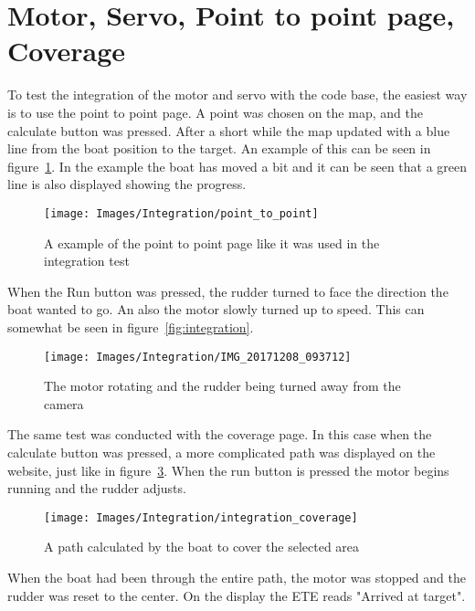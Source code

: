 \section{Motor, Servo, Point to point page, Coverage}
To test the integration of the motor and servo with the code base, the easiest way is to use the point to point page. A point was chosen on the map, and the calculate button was pressed. After a short while the map updated with a blue line from the boat position to the target. An example of this can be seen in figure~\ref{fig:pointtopoint}. In the example the boat has moved a bit and it can be seen that a green line is also displayed showing the progress.

\begin{figure}[H]
\centering
\texttt{[image: Images/Integration/point\_to\_point]}
\caption{A example of the point to point page like it was used in the integration test}
\label{fig:pointtopoint}
\end{figure}

When the Run button was pressed, the rudder turned to face the direction the boat wanted to go. An also the motor slowly turned up to speed. This can somewhat be seen in figure~\ref{fig:integration}.

\begin{figure}[H]
\centering
\texttt{[image: Images/Integration/IMG\_20171208\_093712]}
\caption{The motor rotating and the rudder being turned away from the camera}
\label{fig:integration_motor}
\end{figure}

The same test was conducted with the coverage page. In this case when the calculate button was pressed, a more complicated path was displayed on the website, just like in figure~\ref{fig:integration_coverage}. When the run button is pressed the motor begins running and the rudder adjusts. 

\begin{figure}[h]
\centering
\texttt{[image: Images/Integration/integration\_coverage]}
\caption{A path calculated by the boat to cover the selected area}
\label{fig:integration_coverage}
\end{figure}
 
When the boat had been through the entire path, the motor was stopped and the rudder was reset to the center. On the display the ETE reads "Arrived at target".







